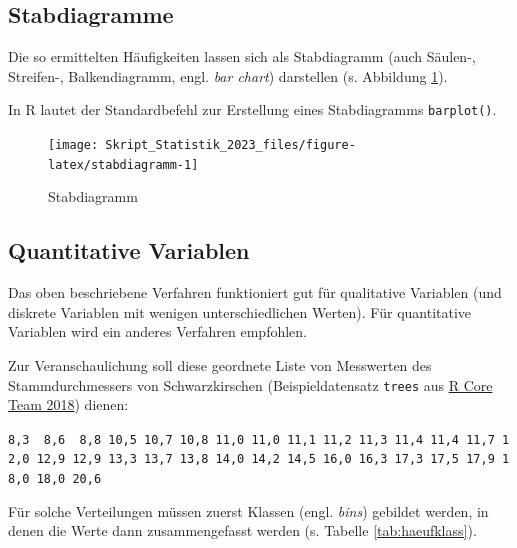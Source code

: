 \documentclass[
  11pt,
  ngerman,
  a4paper,
]{report}
\newenvironment{rtip}{
  \medskip
  \begin{tcolorbox}[colframe=purple,colback=light_gray,title=Softwarehinweis]
}{
  \end{tcolorbox}
  \medskip
}
\begin{document}
\hypertarget{stabdiagramme}{%
\subsection{Stabdiagramme}\label{stabdiagramme}}

Die so ermittelten Häufigkeiten lassen sich als Stabdiagramm (auch Säulen-, Streifen-, Balkendiagramm, engl. \emph{bar chart}) darstellen (s. Abbildung \ref{fig:stabdiagramm}).

\begin{rtip}
In R lautet der Standardbefehl zur Erstellung eines Stabdiagramms \verb|barplot()|.
\end{rtip}

\begin{figure}[!h]

{\centering \texttt{[image: Skript\_Statistik\_2023\_files/figure-latex/stabdiagramm-1]} 

}

\caption{Stabdiagramm}\label{fig:stabdiagramm}
\end{figure}

\hypertarget{quantitative-variablen-1}{%
\subsection{Quantitative Variablen}\label{quantitative-variablen-1}}

Das oben beschriebene Verfahren funktioniert gut für qualitative Variablen (und diskrete Variablen mit wenigen unterschiedlichen Werten). Für quantitative Variablen wird ein anderes Verfahren empfohlen.

Zur Veranschaulichung soll diese geordnete Liste von Messwerten des Stammdurchmessers von Schwarzkirschen (Beispieldatensatz \texttt{trees} aus \protect\hyperlink{ref-r}{R Core Team 2018}) dienen:

\texttt{8,3\ \ 8,6\ \ 8,8\ 10,5\ 10,7\ 10,8\ 11,0\ 11,0\ 11,1\ 11,2\ 11,3\ 11,4\ 11,4\ 11,7\ 12,0\ 12,9\ 12,9\ 13,3\ 13,7\ 13,8\ 14,0\ 14,2\ 14,5\ 16,0\ 16,3\ 17,3\ 17,5\ 17,9\ 18,0\ 18,0\ 20,6}

Für solche Verteilungen müssen zuerst Klassen (engl. \emph{bins}) gebildet werden, in denen die Werte dann zusammengefasst werden (s. Tabelle \ref{tab:haeufklass}).
\end{document}
